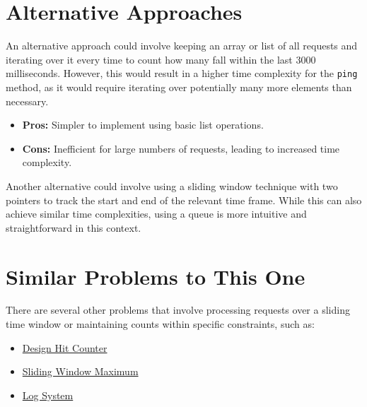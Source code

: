 \section*{Alternative Approaches}
An alternative approach could involve keeping an array or list of all requests and iterating over it every time to count how many fall within the last 3000 milliseconds. However, this would result in a higher time complexity for the \texttt{ping} method, as it would require iterating over potentially many more elements than necessary.

\begin{itemize}
    \item \textbf{Pros:} Simpler to implement using basic list operations.
    \item \textbf{Cons:} Inefficient for large numbers of requests, leading to increased time complexity.
\end{itemize}

Another alternative could involve using a sliding window technique with two pointers to track the start and end of the relevant time frame. While this can also achieve similar time complexities, using a queue is more intuitive and straightforward in this context.


\section*{Similar Problems to This One}
There are several other problems that involve processing requests over a sliding time window or maintaining counts within specific constraints, such as:
\begin{itemize}
    \item \hyperref[problem:design_hit_counter]{Design Hit Counter}
    \item \hyperref[problem:sliding_window_maximum]{Sliding Window Maximum}
    \item \hyperref[problem:log_system]{Log System}
\end{itemize}

